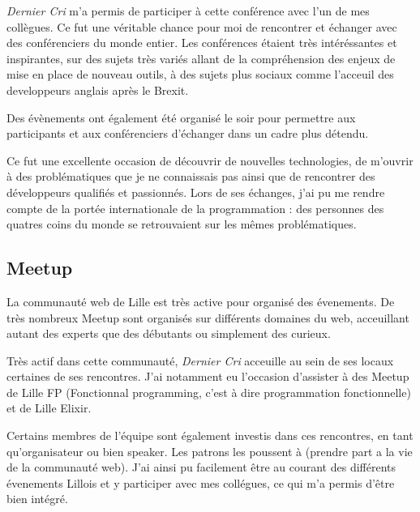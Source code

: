 \documentclass[12pt,a4paper]{article}
\begin{document}
  \emph{Dernier Cri} m'a permis de participer à cette conférence avec l'un
  de mes collègues. Ce fut une véritable chance pour moi de rencontrer et
  échanger avec des conférenciers du monde entier. Les conférences étaient
  très intéréssantes et inspirantes, sur des sujets très variés allant de
  la compréhension des enjeux de mise en place de nouveau outils, à des
  sujets plus sociaux comme l'acceuil des developpeurs anglais après le
  Brexit.

  \bigskip

  Des évènements ont également été organisé le soir pour permettre aux
  participants et aux conférenciers d'échanger dans un cadre plus détendu.

  \bigskip

  Ce fut une excellente occasion de découvrir de nouvelles technologies,
  de m'ouvrir à des problématiques que je ne connaissais pas ainsi que de
  rencontrer des développeurs qualifiés et passionnés. Lors de ses
  échanges, j'ai pu me rendre compte de la portée internationale de la
  programmation : des personnes des quatres coins du monde se retrouvaient
  sur les mêmes problématiques.

  \bigskip

  \subsection{Meetup}\label{meetup}

  \bigskip

  La communauté web de Lille est très active pour organisé des évenements.
  De très nombreux Meetup sont organisés sur différents domaines du web,
  acceuillant autant des experts que des débutants ou simplement des
  curieux.

  \bigskip

  Très actif dans cette communauté, \emph{Dernier Cri} acceuille au sein
  de ses locaux certaines de ses rencontres. J'ai notamment eu l'occasion
  d'assister à des Meetup de Lille FP (Fonctionnal programming, c'est à
  dire programmation fonctionnelle) et de Lille Elixir.

  \bigskip

  Certains membres de l'équipe sont également investis dans ces
  rencontres, en tant qu'organisateur ou bien speaker. Les patrons les
  poussent à (prendre part a la vie de la communauté web). J'ai ainsi pu
  facilement être au courant des différents évenements Lillois et y
  participer avec mes collégues, ce qui m'a permis d'être bien intégré.
\end{document}
